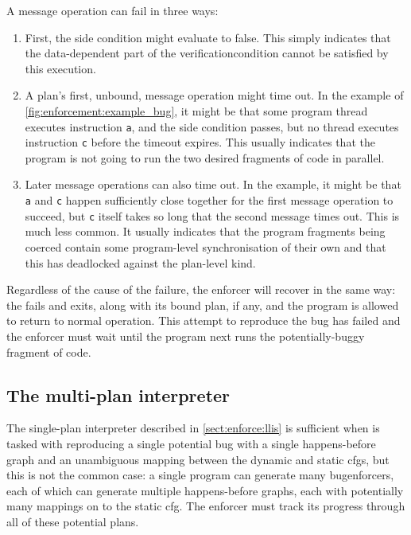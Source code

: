 A message operation can fail in three ways:
\begin{enumerate}
\item
  First, the side condition might evaluate to false.  This simply
  indicates that the data-dependent part of the
  \gls{verificationcondition} cannot be satisfied by this execution.

\item
  A plan's first, unbound, message operation might time out.  In the
  example of \autoref{fig:enforcement:example_bug}, it might be that
  some program thread executes instruction \texttt{a}, and the side
  condition passes, but no thread executes instruction \texttt{c}
  before the timeout expires.  This usually indicates that the program
  is not going to run the two desired fragments of code in parallel.

\item
  Later message operations can also time out.  In the example, it
  might be that \texttt{a} and \texttt{c} happen sufficiently close
  together for the first message operation to succeed, but \texttt{c}
  itself takes so long that the second message times out.  This is
  much less common.  It usually indicates that the program fragments
  being coerced contain some program-level synchronisation of their
  own and that this has deadlocked against the plan-level kind.
\end{enumerate}
Regardless of the cause of the failure, the enforcer will recover in
the same way: the fails and exits, along with its bound plan, if any,
and the program is allowed to return to normal operation.  This
attempt to reproduce the bug has failed and the enforcer must wait
until the program next runs the potentially-buggy fragment of code.

\subsection{The multi-plan interpreter}
\label{sect:enforce:succ}

The single-plan interpreter described in \autoref{sect:enforce:llis}
is sufficient when {\technique} is tasked with reproducing a single
potential bug with a single happens-before graph and an unambiguous
mapping between the dynamic and static \glspl{cfg}, but this is not
the common case: a single program can generate many
\glspl{bugenforcer}, each of which can generate multiple
happens-before graphs, each with potentially many mappings on to the
static \gls{cfg}.  The enforcer must track its progress through all of
these potential plans.

